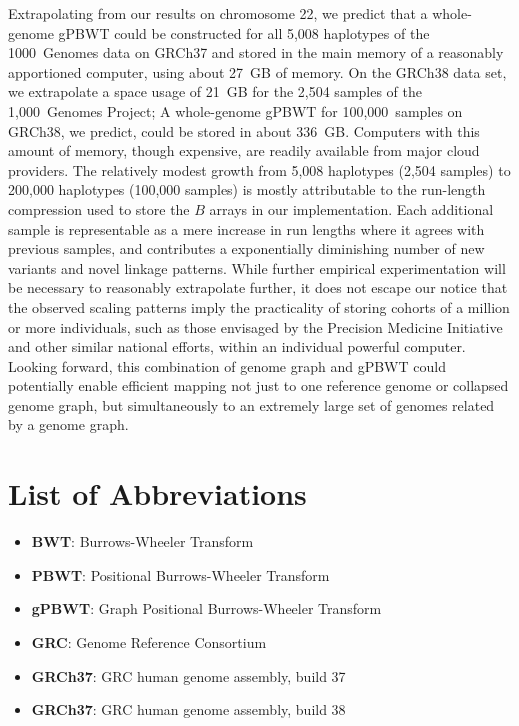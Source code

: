 \begin{sloppypar}
Extrapolating from our results on chromosome 22, we predict that a whole-genome gPBWT could be constructed for all 5,008 haplotypes of the 1000~Genomes data on GRCh37 and stored in the main memory of a reasonably apportioned computer, using about 27~GB of memory. On the GRCh38 data set, we extrapolate a space usage of 21~GB for the 2,504 samples of the 1,000~Genomes Project; A whole-genome gPBWT for 100,000~samples on GRCh38, we predict, could be stored in about 336~GB. Computers with this amount of memory, though expensive, are readily available from major cloud providers. The relatively modest growth from 5,008 haplotypes (2,504 samples) to 200,000 haplotypes (100,000 samples) is mostly attributable to the run-length compression used to store the $B$ arrays in our implementation. Each additional sample is representable as a mere increase in run lengths where it agrees with previous samples, and contributes a exponentially diminishing number of new variants and novel linkage patterns. While further empirical experimentation will be necessary to reasonably extrapolate further, it does not escape our notice that the observed scaling patterns imply the practicality of storing cohorts of a million or more individuals, such as those envisaged by the Precision Medicine Initiative \cite{hudson2015precision} and other similar national efforts, within an individual powerful computer. Looking forward, this combination of genome graph and gPBWT could potentially enable efficient mapping not just to one reference genome or collapsed genome graph, but simultaneously to an extremely large set of genomes related by a genome graph.
\end{sloppypar}

\section{List of Abbreviations}
\begin{itemize}
\item \textbf{BWT}: Burrows-Wheeler Transform
\item \textbf{PBWT}: Positional Burrows-Wheeler Transform
\item \textbf{gPBWT}: Graph Positional Burrows-Wheeler Transform
\item \textbf{GRC}: Genome Reference Consortium
\item \textbf{GRCh37}: GRC human genome assembly, build 37
\item \textbf{GRCh37}: GRC human genome assembly, build 38
\end{itemize}

